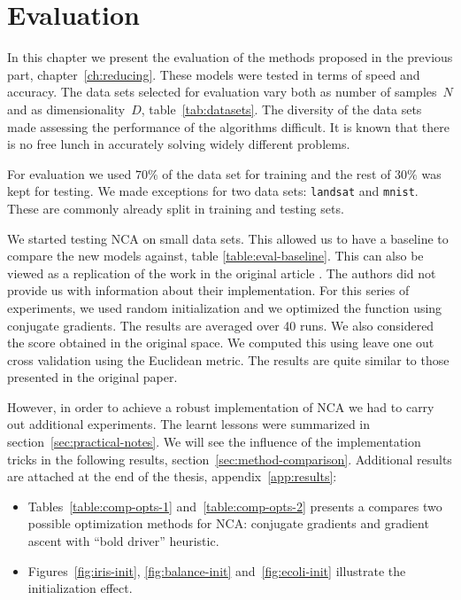 \chapter{Evaluation}
\label{ch:evaluation}

In this chapter we present the evaluation of the methods proposed in the previous part, chapter~\ref{ch:reducing}. These models were tested in terms of speed and accuracy. The data sets selected for evaluation vary both as number of samples~$N$ and as dimensionality~$D$, table~\ref{tab:datasets}. The diversity of the data sets made assessing the performance of the algorithms difficult. It is known that there is no free lunch in accurately solving widely different problems.

For evaluation we used $70\%$ of the data set for training and the rest of $30\%$ was kept for testing. We made exceptions for two data sets: \texttt{landsat} and \texttt{mnist}. These are commonly already split in training and testing sets.

We started testing NCA on small data sets. This allowed us to have a baseline to compare the new models against, table \ref{table:eval-baseline}. This can also be viewed as a replication of the work in the original article \citet{goldberger2004}. The authors did not provide us with information about their implementation. For this series of experiments, we used random initialization and we optimized the function using conjugate gradients. The results are averaged over 40 runs. We also considered the score obtained in the original space. We computed this using leave one out cross validation using the Euclidean metric. The results are quite similar to those presented in the original paper.  

However, in order to achieve a robust implementation of NCA we had to carry out additional experiments. The learnt lessons were summarized in section~\ref{sec:practical-notes}. We will see the influence of the implementation tricks in the following results, section~\ref{sec:method-comparison}. Additional results are attached at the end of the thesis, appendix~\ref{app:results}:
\begin{itemize}
 \item Tables~\ref{table:comp-opts-1} and~\ref{table:comp-opts-2} presents a compares two possible optimization methods for NCA: conjugate gradients and gradient ascent with ``bold driver'' heuristic.
 \item Figures~\ref{fig:iris-init}, \ref{fig:balance-init} and~\ref{fig:ecoli-init} illustrate the initialization effect. 
\end{itemize}

